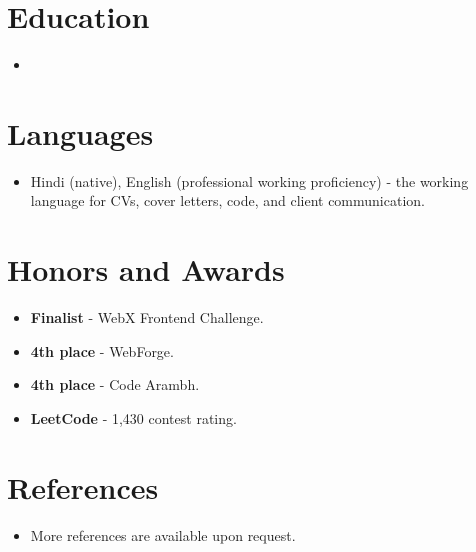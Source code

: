 \documentclass[11pt,a4paper,sans]{moderncv}
\begin{document}

\section{Education}
\vspace{1pt}
\begin{itemize}

\item{}

\end{itemize}


\section{Languages}
\vspace{1pt}
\begin{itemize}
\item {Hindi (native), English (professional working proficiency) - the working language for CVs, cover letters, code, and client communication.}
\end{itemize}


\section{Honors and Awards}
\vspace{1pt}
\begin{itemize}
\item{\textbf{Finalist} - WebX Frontend Challenge.}
\item{\textbf{4th place} - WebForge.}
\item{\textbf{4th place} - Code Arambh.}
\item{\textbf{LeetCode} - 1,430 contest rating.}
\end{itemize}


\section{References}
\vspace{1pt}
\begin{itemize}
\item{More references are available upon request.}
\end{itemize}
\end{document}
